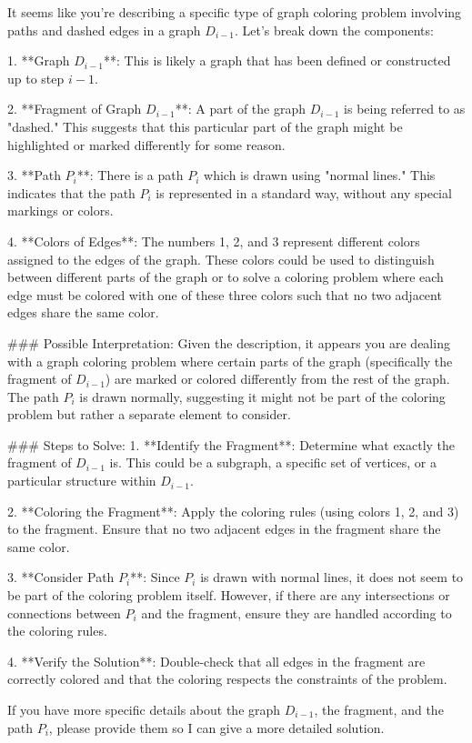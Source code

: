 It seems like you're describing a specific type of graph coloring problem involving paths and dashed edges in a graph \(D_{i-1}\). Let's break down the components:

1. **Graph \(D_{i-1}\)**: This is likely a graph that has been defined or constructed up to step \(i-1\).

2. **Fragment of Graph \(D_{i-1}\)**: A part of the graph \(D_{i-1}\) is being referred to as "dashed." This suggests that this particular part of the graph might be highlighted or marked differently for some reason.

3. **Path \(P_i\)**: There is a path \(P_i\) which is drawn using "normal lines." This indicates that the path \(P_i\) is represented in a standard way, without any special markings or colors.

4. **Colors of Edges**: The numbers 1, 2, and 3 represent different colors assigned to the edges of the graph. These colors could be used to distinguish between different parts of the graph or to solve a coloring problem where each edge must be colored with one of these three colors such that no two adjacent edges share the same color.

### Possible Interpretation:
Given the description, it appears you are dealing with a graph coloring problem where certain parts of the graph (specifically the fragment of \(D_{i-1}\)) are marked or colored differently from the rest of the graph. The path \(P_i\) is drawn normally, suggesting it might not be part of the coloring problem but rather a separate element to consider.

### Steps to Solve:
1. **Identify the Fragment**: Determine what exactly the fragment of \(D_{i-1}\) is. This could be a subgraph, a specific set of vertices, or a particular structure within \(D_{i-1}\).

2. **Coloring the Fragment**: Apply the coloring rules (using colors 1, 2, and 3) to the fragment. Ensure that no two adjacent edges in the fragment share the same color.

3. **Consider Path \(P_i\)**: Since \(P_i\) is drawn with normal lines, it does not seem to be part of the coloring problem itself. However, if there are any intersections or connections between \(P_i\) and the fragment, ensure they are handled according to the coloring rules.

4. **Verify the Solution**: Double-check that all edges in the fragment are correctly colored and that the coloring respects the constraints of the problem.

If you have more specific details about the graph \(D_{i-1}\), the fragment, and the path \(P_i\), please provide them so I can give a more detailed solution.